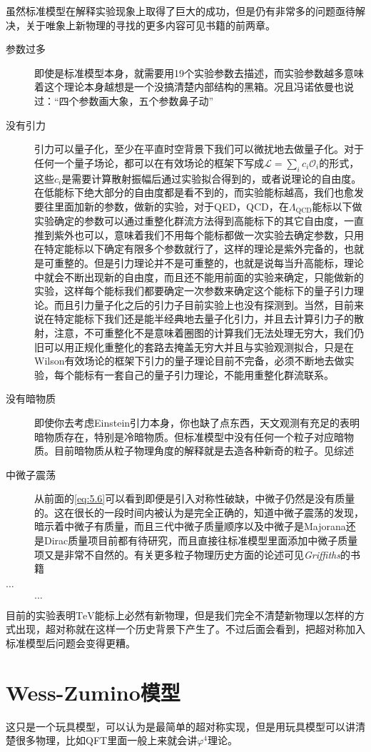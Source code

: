 虽然标准模型在解释实验现象上取得了巨大的成功，但是仍有非常多的问题亟待解决，关于唯象上新物理的寻找的更多内容可见书籍\cite{baer_weak_2006}的前两章。
\begin{description}
	\item[参数过多] 即使是标准模型本身，就需要用19个实验参数去描述，而实验参数越多意味着这个理论本身越想是一个没搞清楚内部结构的黑箱。况且冯诺依曼也说过：“四个参数画大象，五个参数鼻子动”\cite{10.1119/1.3254017}
	\item[没有引力]引力可以量子化，至少在平直时空背景下我们可以微扰地去做量子化。对于任何一个量子场论，都可以在有效场论的框架下写成$\mathcal{L}=\sum_ic_i\mathcal{O}_i$的形式，这些$c_i$是需要计算散射振幅后通过实验拟合得到的，或者说理论的自由度。在低能标下绝大部分的自由度都是看不到的，而实验能标越高，我们也愈发要往里面加新的参数，做新的实验，对于QED，QCD，在$\Lambda_{\mathrm{QCD}}$能标以下做实验确定的参数可以通过重整化群流方法得到高能标下的其它自由度，一直推到紫外也可以，意味着我们不用每个能标都做一次实验去确定参数，只用在特定能标以下确定有限多个参数就行了，这样的理论是紫外完备的，也就是可重整的。但是引力理论并不是可重整的，也就是说每当升高能标，理论中就会不断出现新的自由度，而且还不能用前面的实验来确定，只能做新的实验，这样每个能标我们都要确定一次参数来确定这个能标下的量子引力理论。而且引力量子化之后的引力子目前实验上也没有探测到。当然，目前来说在特定能标下我们还是能半经典地去量子化引力，并且去计算引力子的散射，注意，不可重整化不是意味着圈图的计算我们无法处理无穷大，我们仍旧可以用正规化重整化的套路去掩盖无穷大并且与实验观测拟合，只是在Wilson有效场论的框架下引力的量子理论目前不完备，必须不断地去做实验，每个能标有一套自己的量子引力理论，不能用重整化群流联系。
	\item[没有暗物质] 即使你去考虑Einstein引力本身，你也缺了点东西，天文观测有充足的表明暗物质存在，特别是冷暗物质。但标准模型中没有任何一个粒子对应暗物质。目前暗物质从粒子物理角度的解释就是去造各种新奇的粒子。见综述\cite{frieman_lectures_2008,Young:2016ala,bauer_yet_2019}
	\item[中微子震荡]从前面的\ref{eq:5.6}可以看到即便是引入对称性破缺，中微子仍然是没有质量的。这在很长的一段时间内被认为是完全正确的，知道中微子震荡的发现，暗示着中微子有质量，而且三代中微子质量顺序以及中微子是Majorana还是Dirac质量项目前都有待研究，而且直接往标准模型里面添加中微子质量项又是非常不自然的。有关更多粒子物理历史方面的论述可见{\itshape Griffiths}的书籍\cite{doi:https://doi.org/10.1002/9783527618460.ch1}
	\item [$\ldots$]$\ldots$
\end{description}

\PRLsep

目前的实验表明$\mathrm{TeV}$能标上必然有新物理，但是我们完全不清楚新物理以怎样的方式出现，超对称就在这样一个历史背景下产生了。不过后面会看到，把超对称加入标准模型后问题会变得更糟。

\section{Wess-Zumino模型}
这只是一个玩具模型，可以认为是最简单的超对称实现，但是用玩具模型可以讲清楚很多物理，比如QFT里面一般上来就会讲$\varphi^4$理论。